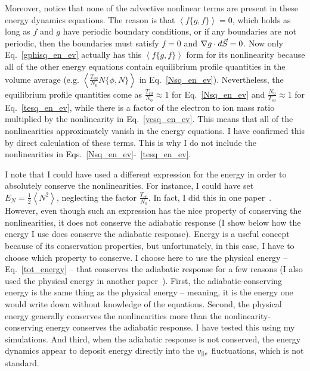 Moreover, notice that none of the advective nonlinear terms are present in these energy dynamics equations. 
The reason is that $\left< f \{ g,f \} \right> = 0$, which holds as long as $f$ and $g$ have periodic boundary conditions, or if any boundaries are not periodic, 
then the boundaries must satisfy $f=0$ and $\nabla g \cdot d\vec{S} = 0$.
Now only Eq.~\ref{gphisq_en_ev} actually has this $\left< f \{ g,f \} \right> $ form for its nonlinearity
because all of the other energy equations contain equilibrium profile quantities in the volume average (e.g. $\left< \frac{T_{e0}}{N_0} N \{ \phi,N \} \right>$ in Eq.~\ref{Nsq_en_ev}).
Nevertheless, the equilibrium profile quantities come as $\frac{T_{e0}}{N_0} \approx 1$ for Eq.~\ref{Nsq_en_ev} and $\frac{N_0}{T_{e0}} \approx 1$ for Eq.~\ref{tesq_en_ev},
while there is a factor of the electron to ion mass ratio multiplied by the nonlinearity in Eq.~\ref{vesq_en_ev}. This means that all of the nonlinearities approximately vanish
in the energy equations. I have confirmed this by direct calculation of these terms. This is why I do not include the nonlinearities in Eqs.~\ref{Nsq_en_ev}-~\ref{tesq_en_ev}.

I note that I could have used a different expression for the energy in order to absolutely conserve the nonlinearities. For instance, I could have set $E_N = \frac{1}{2} \left< N^2 \right>$,
neglecting the factor $\frac{T_{e0}}{N_0}$. In fact, I did this in one paper~\cite{friedman2012b}.
However, even though such an expression has the nice property of conserving the nonlinearities, it does not conserve the adiabatic response (I show below how the energy I use does conserve
the adiabatic response).
Energy is a useful concept because of its conservation properties, but unfortunately, in this case, I have to choose which property to conserve. I choose here to use the physical energy 
-- Eq.~\ref{tot_energy} -- that conserves the adiabatic response for a few reasons (I also used the physical energy in another paper~\cite{friedman2013}).
First, the adiabatic-conserving energy is the same thing as the physical energy -- meaning, it is the energy one would write down without knowledge of the equations. 
Second, the physical energy generally conserves the nonlinearities more than the nonlinearity-conserving energy conserves the adiabatic response. I have tested this using my simulations.
And third, when the adiabatic response is not conserved, the energy dynamics appear to deposit energy directly into the $v_{\parallel e}$ fluctuations, which is not standard.

